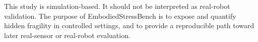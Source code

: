 This study is simulation-based. It should not be interpreted as real-robot validation. The purpose of EmbodiedStressBench is to expose and quantify hidden fragility in controlled settings, and to provide a reproducible path toward later real-sensor or real-robot evaluation.
